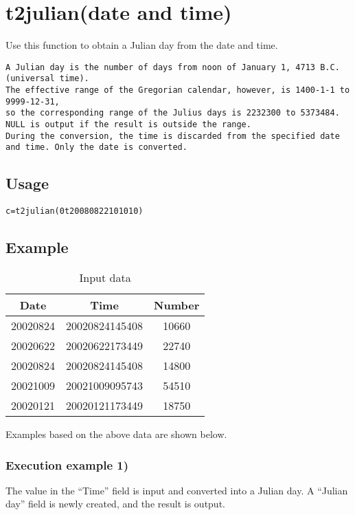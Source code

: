 
%

\section{t2julian(date and time)\label{sect:t2julian}}
Use this function to obtain a Julian day from the date and time.

\begin{verbatim}
A Julian day is the number of days from noon of January 1, 4713 B.C. (universal time).
The effective range of the Gregorian calendar, however, is 1400-1-1 to 9999-12-31,
so the corresponding range of the Julius days is 2232300 to 5373484. NULL is output if the result is outside the range.
During the conversion, the time is discarded from the specified date and time. Only the date is converted.
\end{verbatim}

\subsection*{Usage}
\begin{verbatim}
c=t2julian(0t20080822101010)
\end{verbatim}

\subsection*{Example}

\begin{table}[hbt]
\begin{center}
 \caption{Input data}
  \begin{tabular}{|c|c|c|} \hline
Date&Time&Number\\ \hline\hline
20020824&20020824145408&10660\\ \hline
20020622&20020622173449&22740\\ \hline
20020824&20020824145408&14800\\ \hline
20021009&20021009095743&54510\\ \hline
20020121&20020121173449&18750\\ \hline
  \end{tabular}
  \end{center}
\end{table}
Examples based on the above data are shown below.

\subsubsection*{Execution example 1)}
The value in the “Time” field is input and converted into a Julian day. A “Julian day” field is newly created, and the result is output.

